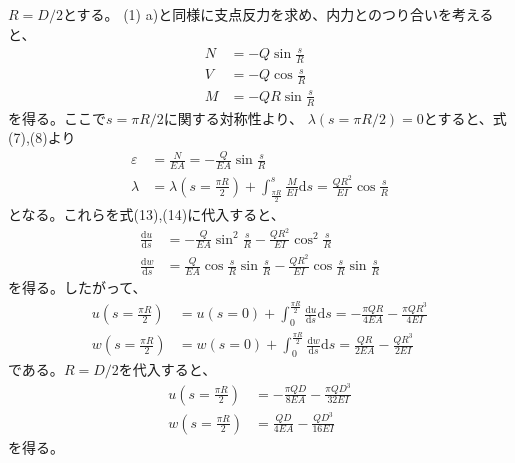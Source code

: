\documentclass[a4paper]{jsarticle}
\begin{document}
\subsection{}
$R = D/2$とする。
(1) a)と同様に支点反力を求め、内力とのつり合いを考えると、
\begin{align}
  N &= -Q \sin \frac{s}{R} \\
  V &= -Q \cos \frac{s}{R} \\
  M &= -Q R \sin \frac{s}{R}
\end{align}
を得る。ここで$s = \pi R / 2$に関する対称性より、
$\lambda(s = \pi R / 2) = 0$とすると、式(7),(8)より
\begin{align}
  \varepsilon &= \frac{N}{E A} =
  -\frac{Q}{E A} \sin \frac{s}{R} \\
  \lambda &= \lambda\left(s = \frac{\pi R}{2}\right)
  + \int_{\frac{\pi R}{2}}^s \frac{M}{E I} \mathrm{d} s
  = \frac{Q R^2}{E I} \cos \frac{s}{R}
\end{align}
となる。これらを式(13),(14)に代入すると、
\begin{align}
  \frac{\mathrm{d} u}{\mathrm{d} s}
  &= -\frac{Q}{E A} \sin^2 \frac{s}{R}
  - \frac{Q R^2}{E I} \cos^2 \frac{s}{R} \\
  \frac{\mathrm{d} w}{\mathrm{d} s}
  &= \frac{Q}{E A} \cos \frac{s}{R} \sin \frac{s}{R}
  - \frac{Q R^2}{E I} \cos \frac{s}{R} \sin \frac{s}{R}
\end{align}
を得る。したがって、
\begin{align}
  u \left(s = \frac{\pi R}{2}\right) &= u(s = 0)
  + \int_0^{\frac{\pi R}{2}} \frac{\mathrm{d} u}{\mathrm{d} s} \mathrm{d} s
  = -\frac{\pi Q R}{4 E A} - \frac{\pi Q R^3}{4 E I}\\
  w \left(s = \frac{\pi R}{2}\right) &= w(s = 0)
  + \int_0^{\frac{\pi R}{2}} \frac{\mathrm{d} w}{\mathrm{d} s} \mathrm{d} s
  = \frac{Q R}{2 E A} - \frac{Q R^3}{2 E I}
\end{align}
である。$R = D/2$を代入すると、
\begin{align}
  u \left(s = \frac{\pi R}{2}\right)
  &= -\frac{\pi Q D}{8 E A} - \frac{\pi Q D^3}{32 E I} \\
  w \left(s = \frac{\pi R}{2}\right)
  &= \frac{Q D}{4 E A} - \frac{Q D^3}{16 E I}
\end{align}
を得る。

\section{}
\end{document}
